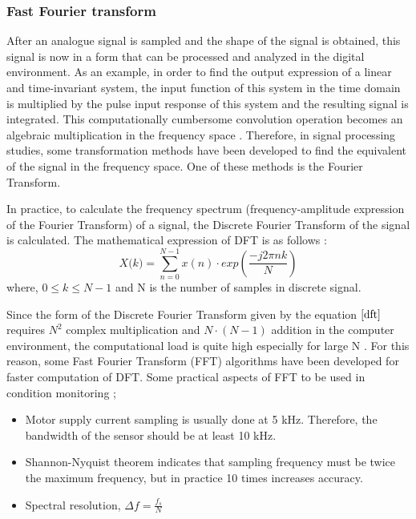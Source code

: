 \subsubsection{Fast Fourier transform}

After an analogue signal is sampled and the shape of the signal is obtained, this signal is now in a form that can be processed and analyzed in the digital environment. As an example, in order to find the output expression of a linear and time-invariant system, the input function of this system in the time domain is multiplied by the pulse input response of this system and the resulting signal is integrated. This computationally cumbersome convolution operation becomes an algebraic multiplication in the frequency space \cite{cernuda2019relevance}. Therefore, in signal processing studies, some transformation methods have been developed to find the equivalent of the signal in the frequency space. One of these methods is the Fourier Transform.

In practice, to calculate the frequency spectrum (frequency-amplitude expression of the Fourier Transform) of a signal, the Discrete Fourier Transform of the signal is calculated. The mathematical expression of DFT is as follows \cite{allen2004signal}:
\begin{equation}
\textit{X(k)}= \displaystyle\sum_{n=0}^{N-1}x(n)\cdot exp\left({\frac{-j2\pi nk}{N}}\right)
\label{dft}
\end{equation}
where, $0 \leq k \leq N-1$ and N is the number of samples in discrete signal.

Since the form of the Discrete Fourier Transform given by the equation $\ref{dft}$ requires $N^2$ complex multiplication and $N\cdot (N-1)$ addition in the computer environment, the computational load is quite high especially for large N \cite{hayes2009statistical,orfanidis1995introduction,allen2004signal,randall2021vibration}. For this reason, some Fast Fourier Transform (FFT) algorithms have been developed for faster computation of DFT. Some practical aspects of FFT to be used in condition monitoring \cite{bonaldi2012predictive};

\begin{itemize}
	\item Motor supply current sampling is usually done at 5 kHz. Therefore, the bandwidth of the sensor should be at least 10 kHz.  
	\item Shannon-Nyquist theorem indicates that sampling frequency must be twice the maximum frequency, but in practice 10 times increases accuracy.
	\item Spectral resolution, $\Delta f = \displaystyle\frac{f_s}{N}$
\end{itemize}

